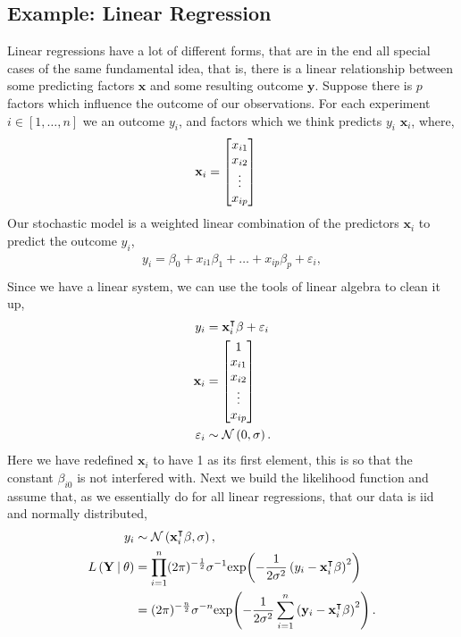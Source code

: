 \subsection{Example: Linear Regression}
\label{subsec: LinearRegression}

Linear regressions have a lot of different forms, that are in the end all special cases of the same fundamental idea, that is, there is a linear relationship between some predicting factors $\mathbf{x}$ and some resulting outcome $\mathbf{y}$. Suppose there is $p$ factors which influence the outcome of our observations. For each experiment $i\in[1,\dots,n]$ we an outcome $y_i$, and factors which we think predicts $y_i$ $\mathbf{x}_i$, where,
\begin{align*}
    \mathbf{x}_i &= \begin{bmatrix} x_{i1} \\ x_{i2} \\ \vdots \\ x_{ip} \end{bmatrix}
\end{align*}
Our stochastic model is a weighted linear combination of the predictors $\mathbf{x}_i$ to predict the outcome $y_i$,
\begin{align*}
    y_{i} = \beta_{0} + x_{i1}\beta_{1} + \dots + x_{ip}\beta_{p} + \varepsilon_{i},\\ 
\end{align*}
Since we have a linear system, we can use the tools of linear algebra to clean it up,
\begin{align*}
    y_i &= \mathbf{x}_i^\intercal \beta + \varepsilon_i\\
    \mathbf{x}_i &= \begin{bmatrix} 1 \\ x_{i1} \\ x_{i2} \\ \vdots \\ x_{ip} \end{bmatrix} \\ 
    \varepsilon_i &\sim \mathcal{N}\left(0, \sigma\right).
\end{align*}
Here we have redefined $\mathbf{x}_i$ to have 1 as its first element, this is so that the constant $\beta_{i0}$ is not interfered with. Next we build the likelihood function and assume that, as we essentially do for all linear regressions, that our data is iid and normally distributed,
\begin{align*}
    y_i &\sim \mathcal{N}\left(\mathbf{x}_i^\intercal\beta, \sigma\right),\\
    L\left( \mathbf{Y} \:\middle|\: \theta \right) &= \prod_{i=1}^{n} (2\pi)^{-\frac{1}{2}}\sigma^{-1}\mathrm{exp}\!\left( -\frac{1}{2\sigma^2}\left(y_i - \mathbf{x}_i^\intercal\beta \right)^2 \right)\\
    &= (2\pi)^{-\frac{n}{2}}\sigma^{-n}\mathrm{exp}\!\left( -\frac{1}{2\sigma^2}\sum_{i=1}^{n}\left(\mathbf{y}_i - \mathbf{x}_i^\intercal\beta\right)^2 \right).
\end{align*}
